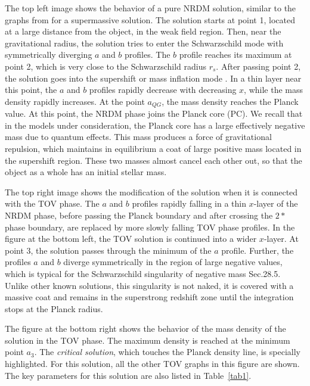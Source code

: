 \documentclass{article}
\begin{document}
The top left image shows the behavior of a pure NRDM solution, similar to the graphs from \cite {bled2020} for a supermassive solution. The solution starts at point 1, located at a large distance from the object, in the weak field region. Then, near the gravitational radius, the solution tries to enter the Schwarzschild mode with symmetrically diverging $ a $ and $ b $ profiles. The $ b $ profile reaches its maximum at point 2, which is very close to the Schwarzschild radius $ r_s $. After passing point 2, the solution goes into the supershift or mass inflation mode \cite {gr-qc/0411062}. In a thin layer near this point, the $ a $ and $ b $ profiles rapidly decrease with decreasing $ x $, while the mass density rapidly increases. At the point $ a_ {QG} $, the mass density reaches the Planck value. At this point, the NRDM phase joins the Planck core (PC). We recall that in the models under consideration, the Planck core has a large effectively negative mass due to quantum effects. This mass produces a force of gravitational repulsion, which maintains in equilibrium a coat of large positive mass located in the supershift region. These two masses almost cancel each other out, so that the object as a whole has an initial stellar mass.

The top right image shows the modification of the solution when it is connected with the TOV phase. The $ a $ and $ b $ profiles rapidly falling in a thin $ x $-layer of the NRDM phase, before passing the Planck boundary and after crossing the $ 2 * $ phase boundary, are replaced by more slowly falling TOV phase profiles. In the figure at the bottom left, the TOV solution is continued into a wider $ x $-layer. At point 3, the solution passes through the minimum of the $ a $ profile. Further, the profiles $ a $ and $ b $ diverge symmetrically in the region of large negative values, which is typical for the Schwarzschild singularity of negative mass \cite {Blau} Sec.28.5. Unlike other known solutions, this singularity is not naked, it is covered with a massive coat and remains in the superstrong redshift zone until the integration stops at the Planck radius.

The figure at the bottom right shows the behavior of the mass density of the solution in the TOV phase. The maximum density is reached at the minimum point $ a_3 $. The {\it critical solution}, which touches the Planck density line, is specially highlighted. For this solution, all the other TOV graphs in this figure are shown. The key parameters for this solution are also listed in Table~\ref {tab1}.
\end{document}
